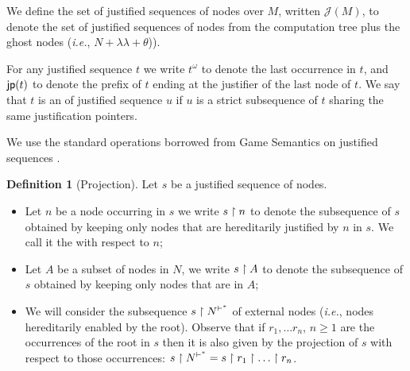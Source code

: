 \documentclass{article}
\makeatletter
\theoremstyle{definition}
\newtheorem{definition}{Definition}[section]
\newcommand\Nodes{N}%
\newcommand{\ghostlmd}{{\lambda\!\!\lambda}}
\newcommand{\ghostvar}{\theta}
\newcommand{\enables}{\vdash} %
\newcommand{\NodeHjByRoot}{\Nodes^{\enables^*}} %
\renewcommand\ie{{\it i.e.\@\xspace}}
\def\justseqset{\mathcal{J}}
\makeatother
\begin{document}
We define the set of justified sequences of nodes over $M$, written $\justseqset(M)$, to denote the set of justified sequences of nodes from the computation tree plus the ghost nodes (\ie, $\Nodes + \ghostlmd + \ghostvar$)).

For any justified sequence $t$ we write $t^\omega$ to denote the last occurrence in $t$, and ${\sf jp}(t)$ to denote the prefix of $t$ ending at the justifier of the last node of $t$. We say that $t$ is an  of justified sequence $u$ if $u$ is a strict subsequence of $t$ sharing the same justification pointers.

We use the standard operations borrowed from Game Semantics on justified sequences \cite{Abr02}.

\begin{definition}[Projection]
Let $s$ be a justified sequence of nodes.

\begin{itemize}
\item Let $n$ be a node occurring in $s$ we write $s\upharpoonright n$ to denote the subsequence of $s$ obtained by keeping only nodes that are hereditarily justified by $n$ in $s$. We call it the  with respect to $n$;

 \item Let $A$ be a subset of nodes in $\Nodes$, we write $s \upharpoonright A$ to denote the subsequence of $s$ obtained by keeping only nodes that are in $A$;

 \item We will consider the subsequence $s\filter\NodeHjByRoot$ of external nodes (\ie, nodes hereditarily enabled by the root). Observe that if $r_1, \ldots r_n$, $n\geq 1$ are the occurrences of the root in $s$ then it is also given by the projection of $s$ with respect to those occurrences: $s\filter\NodeHjByRoot = s\filter r_1 \filter \ldots \filter r_n$.
\end{itemize}
\end{definition}
\end{document}
